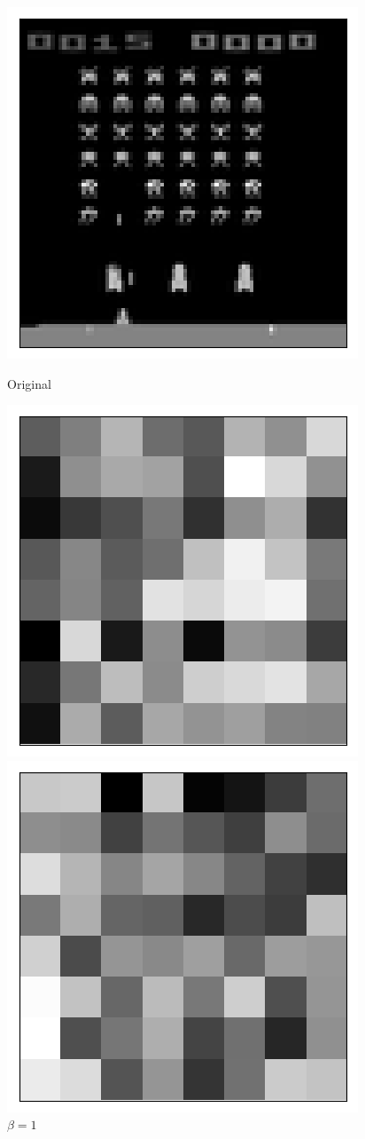 \begin{figure}[h!]
\begin{multicols}{4}
    \includegraphics[scale=0.4]{figures/results/latent_image/beta_1_sample_30_original.png}
    \caption{Original}
    \includegraphics[scale=0.4]{figures/results/latent_image/beta_1_sample_30_latent.png}
    \caption{$\beta=1$}
    \includegraphics[scale=0.4]{figures/results/latent_image/beta_2_sample_30_latent.png}

\end{multicols}
\end{figure}
